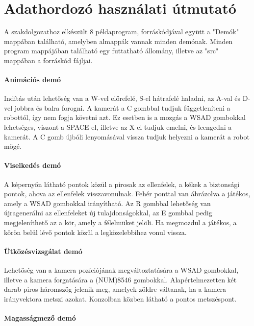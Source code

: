 \chapter*{Adathordozó használati útmutató}

A szakdolgozathoz elkészült 8 példaprogram, forráskódjával együtt a "Demók" mappában található, amelyben almappák vannak minden demónak. Minden program mappájában található egy futtatható állomány, illetve az "src" mappában a forráskód fájljai.

\subsubsection{Animációs demó}

Indítás után lehetőség van a W-vel előrefelé, S-el hátrafelé haladni, az A-val és D-vel jobbra és balra forogni. A kamerát a C gombbal tudjuk függetleníteni a robottól, így nem fogja követni azt. Ez esetben is a mozgás a WSAD gombokkal lehetséges, viszont a SPACE-el, illetve az X-el tudjuk emelni, és leengedni a kamerát. A C gomb újbóli lenyomásával vissza tudjuk helyezni a kamerát a robot mögé.

\subsubsection{Viselkedés demó}

A képernyőn látható pontok közül a pirosak az ellenfelek, a kékek a biztonsági pontok, ahova az ellenfelek visszavonulnak. Fehér ponttal van ábrázolva a játékos, amely a WSAD gombokkal irányítható. Az R gombbal lehetőség van újragenerálni az ellenfeleket új tulajdonságokkal, az E gombbal pedig megjeleníthető az a kör, amely a félelmüket jelöli. Ha megmozdul a játékos, a körön belül lévő pontok közül a legközelebbihez vonul vissza.

\subsubsection{Ütközésvizsgálat demó}

Lehetőség van a kamera pozíciójának megváltoztatására a WSAD gombokkal, illetve a kamera forgatására a (NUM)8546 gombokkal. Alapértelmezetten két darab piros háromszög jelenik meg, amelyek zöldre váltanak, ha a kamera irányvektora metszi azokat. Konzolban közben látható a pontos metszéspont.

\subsubsection{Magasságmező demó}

